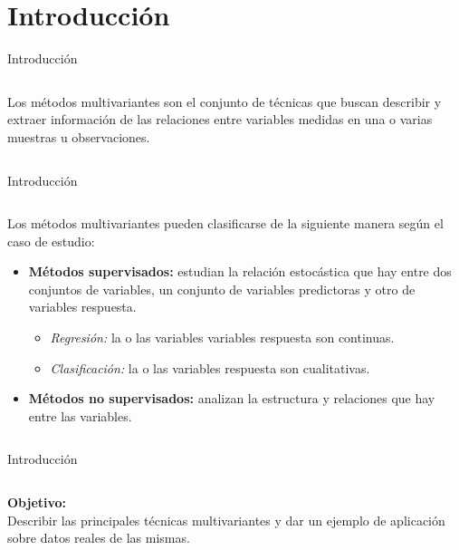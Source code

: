 \section{Introducción}
\begin{frame}{Introducción}
\begin{columns}
\begin{column}{0.9\textwidth}
\begin{defi}
Los métodos multivariantes son el conjunto de técnicas que buscan describir y extraer información de las relaciones entre variables medidas en una o varias muestras u observaciones. 
\end{defi}
\end{column}
\end{columns}

\end{frame}

\begin{frame}{Introducción}
\begin{columns}
\begin{column}{0.9\textwidth}
Los métodos multivariantes pueden clasificarse de la siguiente manera según el caso de estudio:
\begin{itemize}
\item \textbf{Métodos supervisados:} estudian la relación estocástica que hay entre dos conjuntos de variables, un conjunto de variables predictoras y otro de variables respuesta. 
\begin{itemize}
\item \textit{Regresión:} la o las  variables variables respuesta son continuas. 
\item \textit{Clasificación: }la o las variables respuesta son cualitativas. 
\end{itemize}
\item \textbf{Métodos no supervisados: }analizan la estructura y relaciones que hay entre las variables.
\end{itemize}
\end{column}
\end{columns}
\end{frame}

\begin{frame}{Introducción}
\begin{columns}
\begin{column}{0.9\textwidth}
\textbf{Objetivo: }\\
Describir las principales técnicas multivariantes y dar un ejemplo de aplicación sobre datos reales de las mismas.
\end{column}
\end{columns}
\end{frame}
